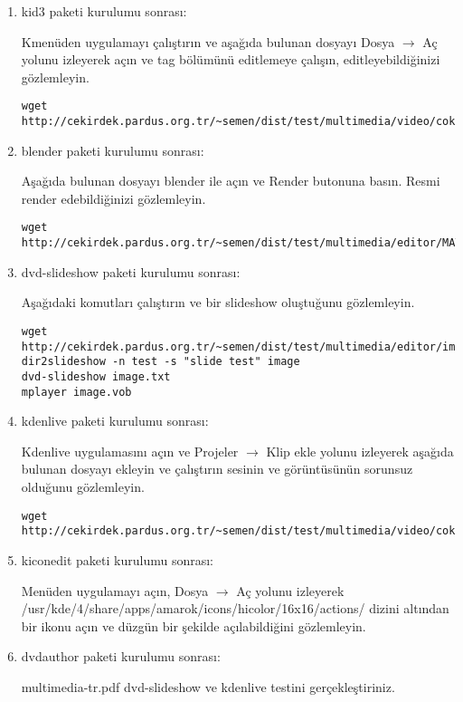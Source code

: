\documentclass[a4paper,10pt]{article}
\begin{document}
\begin{enumerate}
\item kid3 paketi kurulumu sonrası:

Kmenüden uygulamayı çalıştırın ve aşağıda bulunan dosyayı Dosya $\rightarrow$ Aç yolunu izleyerek açın ve tag bölümünü editlemeye çalışın, editleyebildiğinizi gözlemleyin.

\begin{verbatim}
wget http://cekirdek.pardus.org.tr/~semen/dist/test/multimedia/video/cokluortam/linux.mp3 
\end{verbatim}

 \item blender paketi kurulumu sonrası:

Aşağıda bulunan dosyayı blender ile açın ve Render butonuna basın. Resmi render edebildiğinizi gözlemleyin.
\begin{verbatim}
wget http://cekirdek.pardus.org.tr/~semen/dist/test/multimedia/editor/MATtests1.blend 
\end{verbatim}

 \item dvd-slideshow paketi kurulumu sonrası:

Aşağıdaki komutları çalıştırın ve bir slideshow oluştuğunu gözlemleyin.
\begin{verbatim}
wget http://cekirdek.pardus.org.tr/~semen/dist/test/multimedia/editor/image.tar.gz
dir2slideshow -n test -s "slide test" image
dvd-slideshow image.txt
mplayer image.vob 
\end{verbatim}
\item kdenlive paketi kurulumu sonrası:

Kdenlive uygulamasını açın ve Projeler $\rightarrow$ Klip ekle yolunu izleyerek aşağıda bulunan dosyayı ekleyin ve çalıştırın sesinin ve görüntüsünün sorunsuz olduğunu gözlemleyin.
\begin{verbatim}
wget http://cekirdek.pardus.org.tr/~semen/dist/test/multimedia/video/cokluortam/DVD.mpg
\end{verbatim}

\item kiconedit paketi kurulumu sonrası:

Menüden uygulamayı açın, Dosya $\rightarrow$ Aç yolunu izleyerek /usr/kde/4/share/apps/amarok/icons/hicolor/16x16/actions/ dizini altından bir ikonu açın ve düzgün bir şekilde açılabildiğini gözlemleyin.

\item dvdauthor paketi kurulumu sonrası:

multimedia-tr.pdf dvd-slideshow ve kdenlive testini gerçekleştiriniz.


\end{enumerate}
\end{document}

